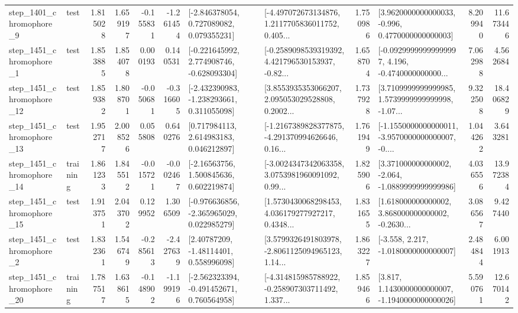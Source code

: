 \begin{tabular}{llrrrrllrlrr}
  step\_1401\_chromophore\_9 &      test &      1.815028 &    1.659197 &     -0.155831 & -1.261454 &    [-2.846378054, 0.727089082, 0.079355231] &  [-4.497072673134876, 1.2117705836011752, 0.405... &       1.750986 &   [3.9620000000000033, -0.996, 0.4770000000000003] &            8.209940 &         11.673446 \\
  step\_1451\_chromophore\_1 &      test &      1.853885 &    1.854078 &      0.000193 &  0.140531 &   [-0.221645992, 2.774908746, -0.628093304] &  [-0.2589098539319392, 4.421796530153937, -0.82... &       1.658704 &  [-0.09299999999999997, 4.196, -0.4740000000000... &            7.062988 &          4.562684 \\
 step\_1451\_chromophore\_12 &      test &      1.859382 &    1.808701 &     -0.050681 & -0.316605 &   [-2.432390983, -1.238293661, 0.311055098] &  [3.8553935353066207, 2.095053029528808, 0.2002... &       1.737928 &  [3.7109999999999985, 1.5739999999999998, -1.07... &            9.322508 &         18.406829 \\
 step\_1451\_chromophore\_13 &      test &      1.952717 &    2.008526 &      0.055808 &  0.640276 &     [0.717984113, 2.614983183, 0.046212897] &  [-1.2167389828377875, -4.291370994626646, 0.16... &       1.761949 &  [-1.1550000000000011, -3.9570000000000007, -0.... &            1.044262 &          3.643281 \\
 step\_1451\_chromophore\_14 &  training &      1.861233 &    1.845512 &     -0.015721 & -0.002467 &     [-2.16563756, 1.500845636, 0.602219874] &  [-3.0024347342063358, 3.0753981960091092, 0.99... &       1.825906 &   [3.371000000000002, -2.064, -1.0889999999999986] &            4.036556 &         13.972384 \\
 step\_1451\_chromophore\_15 &      test &      1.913751 &    2.043702 &      0.129952 &  1.306509 &   [-0.976636856, -2.365965029, 0.022985279] &  [1.5730430068298453, 4.036179277927217, 0.4348... &       1.831655 &  [1.618000000000002, 3.868000000000002, -0.2630... &            3.086567 &          9.427440 \\
  step\_1451\_chromophore\_2 &      test &      1.832361 &    1.546749 &     -0.285613 & -2.427639 &      [2.40787209, -1.48114401, 0.558996098] &  [3.5799326491803978, -2.8061125094965123, 1.14... &       1.863227 &               [-3.558, 2.217, -1.0180000000000007] &            2.484844 &          6.001913 \\
 step\_1451\_chromophore\_20 &  training &      1.787517 &    1.638615 &     -0.148902 & -1.199196 &   [-2.562323394, -0.491452671, 0.760564958] &  [-4.314815985788922, -0.258907303711492, 1.337... &       1.859466 &   [3.817, 1.1430000000000007, -1.1940000000000026] &            5.590761 &         12.670142 \\

\end{tabular}
